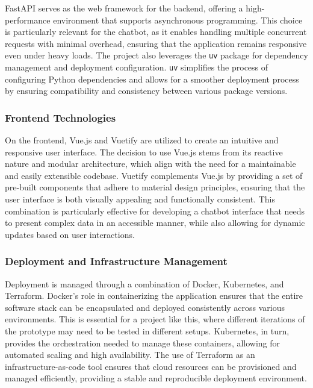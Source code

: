 
FastAPI serves as the web framework for the backend, offering a high-performance environment that supports asynchronous
programming.
This choice is particularly relevant for the chatbot, as it enables handling multiple concurrent requests
with minimal overhead, ensuring that the application remains responsive even under heavy loads.
The project also
leverages the \texttt{uv} package for dependency management and deployment configuration. \texttt{uv}
simplifies the process of configuring Python dependencies and allows for a smoother deployment process by ensuring
compatibility and consistency between various package versions.

\subsubsection{Frontend Technologies}

On the frontend, Vue.js and Vuetify are utilized to create an intuitive and responsive user interface.
The decision to
use Vue.js stems from its reactive nature and modular architecture, which align with the need for a maintainable and
easily extensible codebase.
Vuetify complements Vue.js by providing a set of pre-built components that adhere to
material design principles, ensuring that the user interface is both visually appealing and functionally consistent.
This combination is particularly effective for developing a chatbot interface that needs to present complex data in an
accessible manner, while also allowing for dynamic updates based on user interactions.

\subsubsection{Deployment and Infrastructure Management}

Deployment is managed through a combination of Docker, Kubernetes, and Terraform.
Docker’s role in containerizing the
application ensures that the entire software stack can be encapsulated and deployed consistently across various
environments.
This is essential for a project like this, where different iterations of the prototype may need to be
tested in different setups.
Kubernetes, in turn, provides the orchestration needed to manage these containers, allowing
for automated scaling and high availability.
The use of Terraform as an infrastructure-as-code tool ensures that cloud
resources can be provisioned and managed efficiently, providing a stable and reproducible deployment environment.


